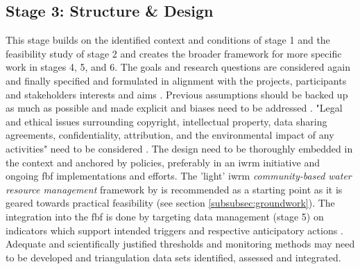 \subsection{Stage 3: Structure \& Design}\label{subsec:stage3_design}
This stage builds on the identified context and conditions of stage 1 and the feasibility study of stage 2 and creates the broader framework for more specific work in stages 4, 5, and 6. The goals and research questions are considered again and finally specified and formulated in alignment with the projects, participants and stakeholders interests and aims \autocite{conradReviewCitizenScience2011,fraislCitizenScienceEnvironmental2022,minkmanCitizenScienceWater2015}. Previous assumptions should be backed up as much as possible and made explicit \autocite{silvertownNewDawnCitizen2009} and biases need to be addressed \autocite{escaeuropeancitizenscienceassociationTenPrinciplesCitizen2015,fraislCitizenScienceEnvironmental2022}. "Legal and ethical issues surrounding copyright, intellectual property, data sharing agreements, confidentiality, attribution, and the environmental impact of any activities" need to be considered \autocite{escaeuropeancitizenscienceassociationTenPrinciplesCitizen2015}. The design need to be thoroughly embedded in the context and anchored by policies, preferably in an \acrlong{iwrm} initiative \autocite{cervoniImplementingIntegratedWater2008,sharpeCommunityBasedEcological2006} and ongoing \acrshort{fbf} implementations and efforts. The 'light' \acrshort{iwrm} \textit{community-based water resource management} framework by \autocite{dayCommunitybasedWaterResources2009} is recommended as a starting point as it is geared towards practical feasibility (see section \ref{subsubsec:groundwork}). The integration into the \acrshort{fbf} is done by targeting data management (stage 5) on indicators which support intended triggers and respective anticipatory actions \autocite{ifrcCommunityBasedSurveillanceGuiding2017}. Adequate and scientifically justified thresholds and monitoring methods may need to be developed and triangulation data sets identified, assessed and integrated. \newline
